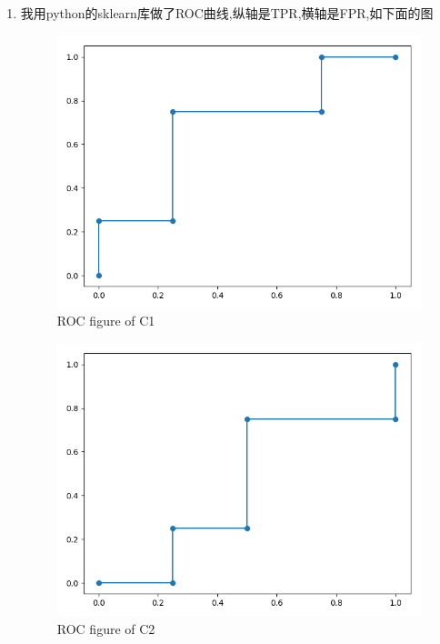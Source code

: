 \documentclass[11pt, a4paper, UTF8]{ctexart}
\begin{document}
\begin{solution}
    \begin{enumerate}
    	\item 我用python的sklearn库做了ROC曲线,纵轴是TPR,横轴是FPR,如下面的图
    	
    	\begin{figure}[h]
    		
    		\centering
    	\includegraphics[scale=0.3]{5-C1.png}
    	\caption{ROC figure of C1}
    	\end{figure}
    	\begin{figure}[h]
    	
    	\centering
    	\includegraphics[scale=0.3]{5-C2.png}
    	\caption{ROC figure of C2}
    	

\end{figure}
\end{enumerate}
\end{solution}
\end{document}
